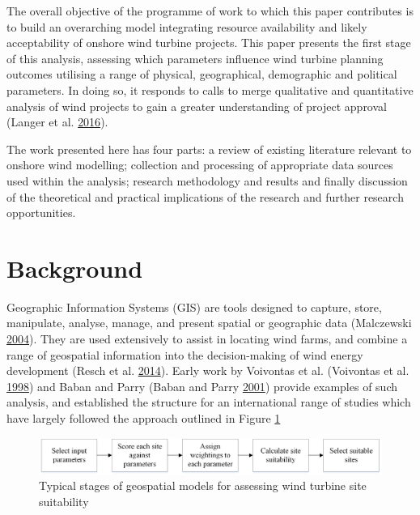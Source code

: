 \documentclass[a4paper,]{article}
\theoremstyle{definition}
\theoremstyle{definition}
\theoremstyle{remark}
\begin{document}
{The overall objective of the programme of work to which this paper
contributes is to build an overarching model integrating resource
availability and likely acceptability of onshore wind turbine projects.
This paper presents the first stage of this analysis, assessing which
parameters influence wind turbine planning outcomes utilising a range of
physical, geographical, demographic and political parameters. In doing
so, it responds to calls to merge qualitative and quantitative analysis
of wind projects to gain a greater understanding of project approval
(Langer et al. \protect\hyperlink{ref-Langer2016a}{2016}).

The work presented here has four parts: a review of existing literature
relevant to onshore wind modelling; collection and processing of
appropriate data sources used within the analysis; research methodology
and results and finally discussion of the theoretical and practical
implications of the research and further research opportunities.

\section{Background}\label{background}

Geographic Information Systems (GIS) are tools designed to capture,
store, manipulate, analyse, manage, and present spatial or geographic
data (Malczewski \protect\hyperlink{ref-Malczewski2004}{2004}). They are
used extensively to assist in locating wind farms, and combine a range
of geospatial information into the decision-making of wind energy
development (Resch et al. \protect\hyperlink{ref-Resch2014}{2014}).
Early work by Voivontas et al. (Voivontas et al.
\protect\hyperlink{ref-Voivontas1998}{1998}) and Baban and Parry (Baban
and Parry \protect\hyperlink{ref-Baban2001}{2001}) provide examples of
such analysis, and established the structure for an international range
of studies which have largely followed the approach outlined in Figure
\ref{fig:StagesofAnalysis}

\begin{figure}
\includegraphics[width=1\linewidth]{figures/Stages} \caption{Typical stages of geospatial models for assessing wind turbine site suitability}\label{fig:StagesofAnalysis}
\end{figure}

}
\end{document}
